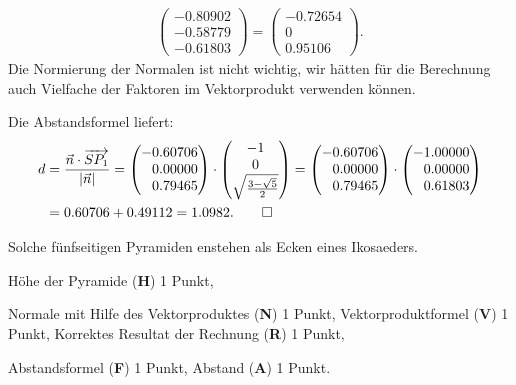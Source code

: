 \begin{loesung}
\begin{teilaufgaben}
\begin{align*}
\begin{pmatrix}
  -0.80902\\
  -0.58779\\
  -0.61803
\end{pmatrix}
=\begin{pmatrix}
  -0.72654\\
   0\\
   0.95106    
\end{pmatrix}.
\end{align*}
Die Normierung der Normalen ist nicht wichtig, wir hätten für die
Berechnung auch Vielfache der Faktoren im Vektorprodukt verwenden können.
\item
Die Abstandsformel liefert:
\begin{align*}
d&=\frac{\vec n\cdot \overrightarrow{SP_1}}{|\vec n|}
=
\begin{pmatrix}
-0.60706\\
\phantom{-}0.00000\\
\phantom{-}0.79465
\end{pmatrix}
\cdot
\begin{pmatrix}
-1\\0\\\sqrt{\frac{3-\sqrt{5}}2}
\end{pmatrix}
=
\begin{pmatrix}
-0.60706\\
\phantom{-}0.00000\\
\phantom{-}0.79465
\end{pmatrix}
\cdot
\begin{pmatrix}
-1.00000\\
\phantom{-}0.00000\\
\phantom{-}0.61803
\end{pmatrix}
\\
&=
0.60706+0.49112
=
1.0982.
\qedhere
\end{align*}
\end{teilaufgaben}
\end{loesung}

\begin{diskussion}
Solche fünfseitigen Pyramiden enstehen als Ecken eines Ikosaeders.
\end{diskussion}

\begin{bewertung}
\begin{teilaufgaben}
\item
Höhe der Pyramide ({\bf H}) 1 Punkt,
\item
Normale mit Hilfe des Vektorproduktes ({\bf N}) 1 Punkt,
Vektorproduktformel ({\bf V}) 1 Punkt,
Korrektes Resultat der Rechnung ({\bf R}) 1 Punkt,
\item
Abstandsformel ({\bf F}) 1 Punkt,
Abstand ({\bf A}) 1 Punkt.
\end{teilaufgaben}
\end{bewertung}




